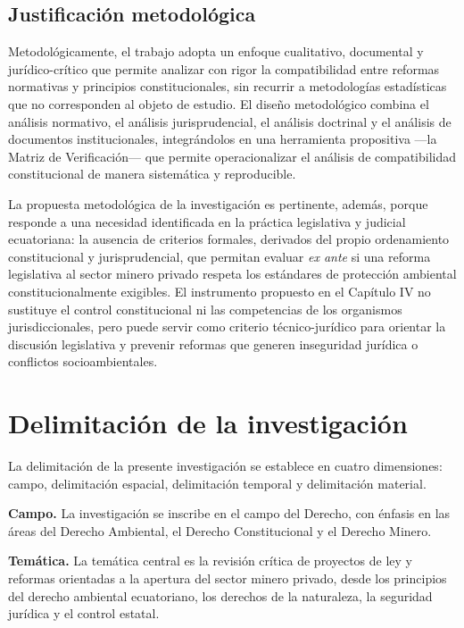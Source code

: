 \subsection{Justificación metodológica}

Metodológicamente, el trabajo adopta un enfoque cualitativo, documental y jurídico-crítico que permite analizar con rigor la compatibilidad entre reformas normativas y principios constitucionales, sin recurrir a metodologías estadísticas que no corresponden al objeto de estudio. El diseño metodológico combina el análisis normativo, el análisis jurisprudencial, el análisis doctrinal y el análisis de documentos institucionales, integrándolos en una herramienta propositiva ---la Matriz de Verificación--- que permite operacionalizar el análisis de compatibilidad constitucional de manera sistemática y reproducible.

La propuesta metodológica de la investigación es pertinente, además, porque responde a una necesidad identificada en la práctica legislativa y judicial ecuatoriana: la ausencia de criterios formales, derivados del propio ordenamiento constitucional y jurisprudencial, que permitan evaluar \textit{ex ante} si una reforma legislativa al sector minero privado respeta los estándares de protección ambiental constitucionalmente exigibles. El instrumento propuesto en el Capítulo IV no sustituye el control constitucional ni las competencias de los organismos jurisdiccionales, pero puede servir como criterio técnico-jurídico para orientar la discusión legislativa y prevenir reformas que generen inseguridad jurídica o conflictos socioambientales.

\section{Delimitación de la investigación}

La delimitación de la presente investigación se establece en cuatro dimensiones: campo, delimitación espacial, delimitación temporal y delimitación material.

\textbf{Campo.} La investigación se inscribe en el campo del Derecho, con énfasis en las áreas del Derecho Ambiental, el Derecho Constitucional y el Derecho Minero.

\textbf{Temática.} La temática central es la revisión crítica de proyectos de ley y reformas orientadas a la apertura del sector minero privado, desde los principios del derecho ambiental ecuatoriano, los derechos de la naturaleza, la seguridad jurídica y el control estatal.


